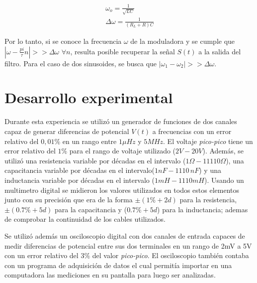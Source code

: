 \documentclass[11pt,a4paper]{article}
\begin{document}
\begin{equation}
\begin{split}
\omega_o = \frac{1}{\sqrt{LC}}\\
\Delta\omega = \frac{1}{(R_L+R)C}
\end{split}
\label{eq:antiresonante}
\end{equation}

Por lo tanto, si se conoce la frecuencia $\omega$ de la moduladora y se cumple que $|\omega-\frac{pi}{\tau}n|>> \Delta\omega$ $\forall n$, resulta posible recuperar la señal $S(t)$ a la salida del filtro. Para el caso de dos sinusoides, se busca que $|\omega_1-\omega_2|>> \Delta\omega$.



\section{Desarrollo experimental}
Durante esta experiencia se utilizó un generador de funciones de dos canales capaz de generar diferencias de potencial $V(t)$ a frecuencias con un error relativo del $0,01\%$ en un rango entre $1\mu Hz$ y $5MHz$. El voltaje \textit{pico-pico} tiene un error relativo del $1\%$ para el rango de voltaje utilizado ($2V-20V$). Además, se utilizó una resistencia variable por décadas en el intervalo ($1\Omega-11110\Omega$), una capacitancia variable por décadas en el intervalo($1nF-1110\,nF$) y una inductancia variable por décadas en el intervalo ($1mH-1110mH$). Usando un multimetro digital se midieron los valores utilizados en todos estos elementos junto con su precisión que era de la forma $\pm(1\%+2d)$ para la resistencia, $\pm(0.7\%+5d)$ para la capacitancia y ($0.7\% +5d$) para la inductancia; ademas de comprobar la continuidad de los cables utilizados.

Se utilizó además un osciloscopio digital con dos canales de entrada capaces de medir diferencias de potencial entre sus dos terminales en un rango de 2mV a 5V con un error relativo del $3\%$ del valor \textit{pico-pico}. El osciloscopio también contaba con un programa de adquisición de datos el cual permitía importar en una computadora las mediciones en su pantalla para luego ser analizadas. 
\end{document}
